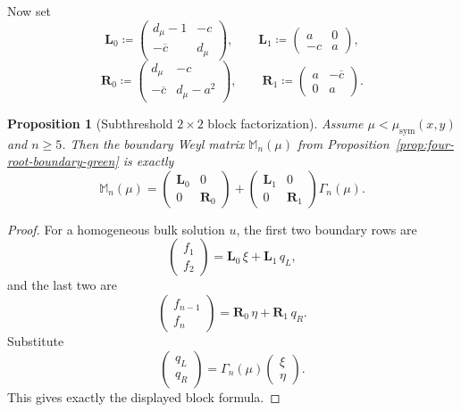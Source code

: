 \documentclass[11pt]{article}
\newtheorem{proposition}[theorem]{Proposition}
\begin{document}
Now set
\[
\mathbf L_0\coloneqq
\begin{pmatrix}
d_\mu-1 & -c\\
-\overline c & d_\mu
\end{pmatrix},
\qquad
\mathbf L_1\coloneqq
\begin{pmatrix}
a&0\\
-c&a
\end{pmatrix},
\]
\[
\mathbf R_0\coloneqq
\begin{pmatrix}
d_\mu & -c\\
-\overline c & d_\mu-a^2
\end{pmatrix},
\qquad
\mathbf R_1\coloneqq
\begin{pmatrix}
a&-\overline c\\
0&a
\end{pmatrix}.
\]

\begin{proposition}[Subthreshold \(2\times2\) block factorization]\label{prop:subthreshold-block-weyl}
Assume \(\mu<\mu_{\mathrm{sym}}(x,y)\) and \(n\ge 5\). Then the boundary Weyl matrix
\(\mathbb M_n(\mu)\) from Proposition~\ref{prop:four-root-boundary-green} is exactly
\[
\boxed{
\mathbb M_n(\mu)
=
\begin{pmatrix}
\mathbf L_0&0\\
0&\mathbf R_0
\end{pmatrix}
+
\begin{pmatrix}
\mathbf L_1&0\\
0&\mathbf R_1
\end{pmatrix}
\Gamma_n(\mu).
}
\]
\end{proposition}

\begin{proof}
For a homogeneous bulk solution \(u\), the first two boundary rows are
\[
\begin{pmatrix}
f_1\\
f_2
\end{pmatrix}
=
\mathbf L_0\,\xi+\mathbf L_1\,q_L,
\]
and the last two are
\[
\begin{pmatrix}
f_{n-1}\\
f_n
\end{pmatrix}
=
\mathbf R_0\,\eta+\mathbf R_1\,q_R.
\]
Substitute
\[
\begin{pmatrix}
q_L\\
q_R
\end{pmatrix}
=
\Gamma_n(\mu)
\begin{pmatrix}
\xi\\
\eta
\end{pmatrix}.
\]
This gives exactly the displayed block formula.
\end{proof}
\end{document}
